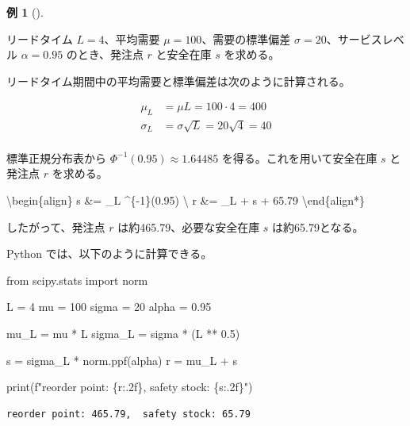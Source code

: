\documentclass[
  japanese,
  letterpaper,
]{ltjbook}
\newenvironment{Shaded}{\begin{snugshade}}{\end{snugshade}}
\newcommand{\BuiltInTok}[1]{\textcolor[rgb]{0.00,0.23,0.31}{#1}}
\newcommand{\DecValTok}[1]{\textcolor[rgb]{0.68,0.00,0.00}{#1}}
\newcommand{\FloatTok}[1]{\textcolor[rgb]{0.68,0.00,0.00}{#1}}
\newcommand{\ImportTok}[1]{\textcolor[rgb]{0.00,0.46,0.62}{#1}}
\newcommand{\NormalTok}[1]{\textcolor[rgb]{0.00,0.23,0.31}{#1}}
\newcommand{\OperatorTok}[1]{\textcolor[rgb]{0.37,0.37,0.37}{#1}}
\newcommand{\SpecialCharTok}[1]{\textcolor[rgb]{0.37,0.37,0.37}{#1}}
\newcommand{\SpecialStringTok}[1]{\textcolor[rgb]{0.13,0.47,0.30}{#1}}
\theoremstyle{plain}
\theoremstyle{definition}
\newtheorem{example}{例}[chapter]
\theoremstyle{remark}
\begin{document}
\begin{example}[]\protect\hypertarget{exm-safety}{}\label{exm-safety}

リードタイム \(L = 4\)、平均需要 \(\mu = 100\)、需要の標準偏差
\(\sigma = 20\)、サービスレベル \(\alpha = 0.95\) のとき、発注点 \(r\)
と安全在庫 \(s\) を求める。

リードタイム期間中の平均需要と標準偏差は次のように計算される。

\begin{align}
\mu_L &= \mu L = 100 \cdot 4 = 400 \\
\sigma_L &= \sigma \sqrt{L} = 20 \sqrt{4} = 40 \\
\end{align}

標準正規分布表から \(\Phi^{-1}(0.95) \approx 1.64485\)
を得る。これを用いて安全在庫 \(s\) と発注点 \(r\) を求める。

\textbackslash begin\{align\} s \&= \sigma\_L \Phi\^{}\{-1\}(0.95)
   \textbackslash{} r \&= \mu\_L + s
 + 65.79  \textbackslash end\{align*\}

したがって、発注点 \(r\) は約465.79、必要な安全在庫 \(s\)
は約65.79となる。

Python では、以下のように計算できる。

\begin{Shaded}
\begin{Highlighting}[]
\ImportTok{from}\NormalTok{ scipy.stats }\ImportTok{import}\NormalTok{ norm}

\NormalTok{L }\OperatorTok{=} \DecValTok{4}
\NormalTok{mu }\OperatorTok{=} \DecValTok{100}
\NormalTok{sigma }\OperatorTok{=} \DecValTok{20}
\NormalTok{alpha }\OperatorTok{=} \FloatTok{0.95}

\NormalTok{mu\_L }\OperatorTok{=}\NormalTok{ mu }\OperatorTok{*}\NormalTok{ L}
\NormalTok{sigma\_L }\OperatorTok{=}\NormalTok{ sigma }\OperatorTok{*}\NormalTok{ (L }\OperatorTok{**} \FloatTok{0.5}\NormalTok{)}

\NormalTok{s }\OperatorTok{=}\NormalTok{ sigma\_L }\OperatorTok{*}\NormalTok{ norm.ppf(alpha)}
\NormalTok{r }\OperatorTok{=}\NormalTok{ mu\_L }\OperatorTok{+}\NormalTok{ s}

\BuiltInTok{print}\NormalTok{(}\SpecialStringTok{f"reorder point: }\SpecialCharTok{\{}\NormalTok{r}\SpecialCharTok{:.2f\}}\SpecialStringTok{,  safety stock: }\SpecialCharTok{\{}\NormalTok{s}\SpecialCharTok{:.2f\}}\SpecialStringTok{"}\NormalTok{)}
\end{Highlighting}
\end{Shaded}

\begin{verbatim}
reorder point: 465.79,  safety stock: 65.79
\end{verbatim}

\end{example}
\end{document}
